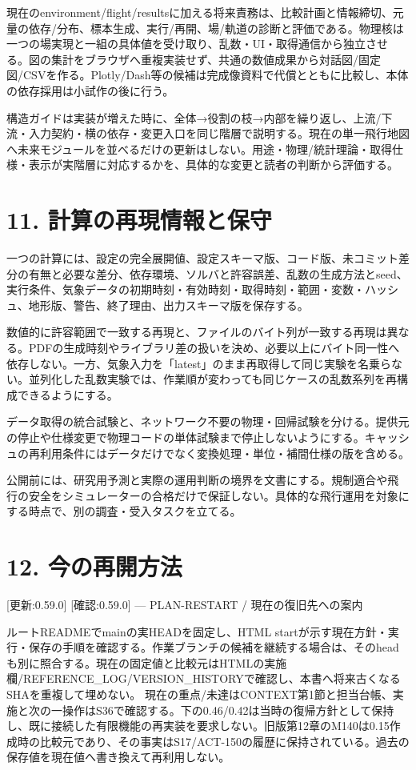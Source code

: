 \documentclass[11pt,a4paper]{article}
\begin{document}
現在のenvironment/flight/resultsに加える将来責務は、比較計画と情報締切、元量の依存/分布、標本生成、実行/再開、場/軌道の診断と評価である。物理核は一つの場実現と一組の具体値を受け取り、乱数・UI・取得通信から独立させる。図の集計をブラウザへ重複実装せず、共通の数値成果から対話図/固定図/CSVを作る。Plotly/Dash等の候補は完成像資料で代償とともに比較し、本体の依存採用は小試作の後に行う。

構造ガイドは実装が増えた時に、全体→役割の枝→内部を繰り返し、上流/下流・入力契約・横の依存・変更入口を同じ階層で説明する。現在の単一飛行地図へ未来モジュールを並べるだけの更新はしない。用途・物理/統計理論・取得仕様・表示が実階層に対応するかを、具体的な変更と読者の判断から評価する。

\section{11.
計算の再現情報と保守}\label{ux8a08ux7b97ux306eux518dux73feux60c5ux5831ux3068ux4fddux5b88}

一つの計算には、設定の完全展開値、設定スキーマ版、コード版、未コミット差分の有無と必要な差分、依存環境、ソルバと許容誤差、乱数の生成方法とseed、実行条件、気象データの初期時刻・有効時刻・取得時刻・範囲・変数・ハッシュ、地形版、警告、終了理由、出力スキーマ版を保存する。

数値的に許容範囲で一致する再現と、ファイルのバイト列が一致する再現は異なる。PDFの生成時刻やライブラリ差の扱いを決め、必要以上にバイト同一性へ依存しない。一方、気象入力を「latest」のまま再取得して同じ実験を名乗らない。並列化した乱数実験では、作業順が変わっても同じケースの乱数系列を再構成できるようにする。

データ取得の統合試験と、ネットワーク不要の物理・回帰試験を分ける。提供元の停止や仕様変更で物理コードの単体試験まで停止しないようにする。キャッシュの再利用条件にはデータだけでなく変換処理・単位・補間仕様の版を含める。

公開前には、研究用予測と実際の運用判断の境界を文書にする。規制適合や飛行の安全をシミュレーターの合格だけで保証しない。具体的な飛行運用を対象にする時点で、別の調査・受入タスクを立てる。

\section{12. 今の再開方法}\label{ux4ecaux306eux518dux958bux65b9ux6cd5}

{[}更新:0.59.0{]} {[}確認:0.59.0{]} --- PLAN-RESTART /
現在の復旧先への案内

ルートREADMEでmainの実HEADを固定し、HTML
startが示す現在方針・実行・保存の手順を確認する。作業ブランチの候補を継続する場合は、そのheadも別に照合する。現在の固定値と比較元はHTMLの実施欄/REFERENCE\_LOG/VERSION\_HISTORYで確認し、本書へ将来古くなるSHAを重複して埋めない。
現在の重点/未達はCONTEXT第1節と担当台帳、実施と次の一操作はS36で確認する。下の0.46/0.42は当時の復帰方針として保持し、既に接続した有限機能の再実装を要求しない。旧版第12章のM140は0.15作成時の比較元であり、その事実はS17/ACT-150の履歴に保持されている。過去の保存値を現在値へ書き換えて再利用しない。
\end{document}

